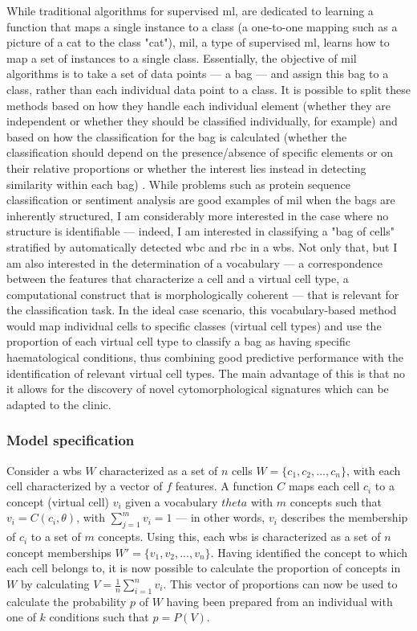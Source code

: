 While traditional algorithms for supervised \ac{ml}, are dedicated to learning a function that maps a single instance to a class (a one-to-one mapping such as a picture of a cat to the class "cat"), \ac{mil}, a type of supervised \ac{ml}, learns how to map a set of instances to a single class. Essentially, the objective of \ac{mil} algorithms is to take a set of data points --- a bag --- and assign this bag to a class, rather than each individual data point to a class. It is possible to split these methods based on how they handle each individual element (whether they are independent or whether they should be classified individually, for example) and based on how the classification for the bag is calculated (whether the classification should depend on the presence/absence of specific elements or on their relative proportions or whether the interest lies instead in detecting similarity within each bag) \cite{Amores2013-ym,Carbonneau2016-xc}. While problems such as protein sequence classification or sentiment analysis are good examples of \ac{mil} when the bags are inherently structured, I am considerably more interested in the case where no structure is identifiable --- indeed, I am interested in classifying a "bag of cells" stratified by automatically detected \ac{wbc} and \ac{rbc} in a \ac{wbs}. Not only that, but I am also interested in the determination of a vocabulary --- a correspondence between the features that characterize a cell and a virtual cell type, a computational construct that is morphologically coherent --- that is relevant for the classification task. In the ideal case scenario, this vocabulary-based method would map individual cells to specific classes (virtual cell types) and use the proportion of each virtual cell type to classify a bag as having specific haematological conditions, thus combining good predictive performance with the identification of relevant virtual cell types. The main advantage of this is that no it allows for the discovery of novel cytomorphological signatures which can be adapted to the clinic.

\subsubsection{Model specification}

Consider a \ac{wbs} $W$ characterized as a set of $n$ cells $W=\{c_1,c_2,...,c_n\}$, with each cell characterized by a vector of $f$ features. A function $C$ maps each cell $c_i$ to a concept (virtual cell) $v_i$ given a vocabulary $theta$ with $m$ concepts such that $v_i = C(c_i,\theta)$, with $\sum_{j=1}^m{v_i} = 1$ --- in other words, $v_i$ describes the membership of $c_i$ to a set of $m$ concepts. Using this, each \ac{wbs} is characterized as a set of $n$ concept memberships $W'=\{v_1,v_2,...,v_n\}$. Having identified the concept to which each cell belongs to, it is now possible to calculate the proportion of concepts in $W$ by calculating $V = \frac{1}{n}\sum_{i=1}^n{v_i}$. This vector of proportions can now be used to calculate the probability $p$ of $W$ having been prepared from an individual with one of $k$ conditions such that $p = P(V)$.


